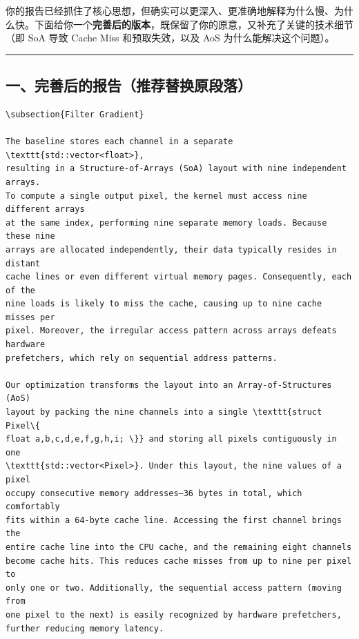 \documentclass[11pt, a4paper]{article}
\begin{document}
\begin{aibox}
你的报告已经抓住了核心思想，但确实可以更深入、更准确地解释为什么慢、为什么快。下面给你一个\textbf{完善后的版本}，既保留了你的原意，又补充了关键的技术细节（即 SoA 导致 Cache Miss 和预取失效，以及 AoS 为什么能解决这个问题）。

\begin{center}\rule{\textwidth}{0.4pt}\end{center}

\subsection*{一、完善后的报告（推荐替换原段落）}

\begin{tcolorbox}[colback=white,colframe=gray!50!white,boxrule=0.5pt,arc=2pt,left=5pt,right=5pt,top=5pt,bottom=5pt]
\begin{verbatim}
\subsection{Filter Gradient}

The baseline stores each channel in a separate \texttt{std::vector<float>}, 
resulting in a Structure-of-Arrays (SoA) layout with nine independent arrays. 
To compute a single output pixel, the kernel must access nine different arrays 
at the same index, performing nine separate memory loads. Because these nine 
arrays are allocated independently, their data typically resides in distant 
cache lines or even different virtual memory pages. Consequently, each of the 
nine loads is likely to miss the cache, causing up to nine cache misses per 
pixel. Moreover, the irregular access pattern across arrays defeats hardware 
prefetchers, which rely on sequential address patterns.

Our optimization transforms the layout into an Array-of-Structures (AoS) 
layout by packing the nine channels into a single \texttt{struct Pixel\{ 
float a,b,c,d,e,f,g,h,i; \}} and storing all pixels contiguously in one 
\texttt{std::vector<Pixel>}. Under this layout, the nine values of a pixel 
occupy consecutive memory addresses—36 bytes in total, which comfortably 
fits within a 64-byte cache line. Accessing the first channel brings the 
entire cache line into the CPU cache, and the remaining eight channels 
become cache hits. This reduces cache misses from up to nine per pixel to 
only one or two. Additionally, the sequential access pattern (moving from 
one pixel to the next) is easily recognized by hardware prefetchers, 
further reducing memory latency.


\end{verbatim}
\end{tcolorbox}
\end{aibox}
\end{document}
